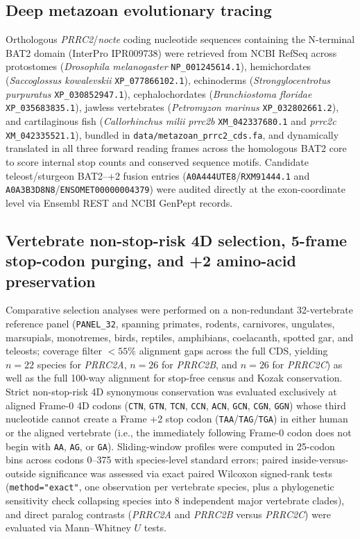 \documentclass[10pt,letterpaper]{article}
\newcommand{\spname}[1]{\textit{#1}}
\newcommand{\gene}[1]{\textit{#1}}
\begin{document}
\subsection{Deep metazoan evolutionary tracing}

Orthologous \gene{PRRC2}/\gene{nocte} coding nucleotide sequences containing the N-terminal BAT2 domain (InterPro IPR009738) were retrieved from NCBI RefSeq across protostomes (\spname{Drosophila melanogaster} \texttt{NP\_001245614.1}), hemichordates (\spname{Saccoglossus kowalevskii} \texttt{XP\_077866102.1}), echinoderms (\spname{Strongylocentrotus purpuratus} \texttt{XP\_030852947.1}), cephalochordates (\spname{Branchiostoma floridae} \texttt{XP\_035683835.1}), jawless vertebrates (\spname{Petromyzon marinus} \texttt{XP\_032802661.2}), and cartilaginous fish (\spname{Callorhinchus milii} \gene{prrc2b} \texttt{XM\_042337680.1} and \gene{prrc2c} \texttt{XM\_042335521.1}), bundled in \texttt{data/metazoan\_prrc2\_cds.fa}, and dynamically translated in all three forward reading frames across the homologous BAT2 core to score internal stop counts and conserved sequence motifs. Candidate teleost/sturgeon BAT2--+2 fusion entries (\texttt{A0A444UTE8}/\texttt{RXM91444.1} and \texttt{A0A3B3D8N8}/\texttt{ENSOMET00000004379}) were audited directly at the exon-coordinate level via Ensembl REST and NCBI GenPept records.

\subsection{Vertebrate non-stop-risk 4D selection, 5-frame stop-codon purging, and +2 amino-acid preservation}

Comparative selection analyses were performed on a non-redundant 32-vertebrate reference panel (\texttt{PANEL\_32}, spanning primates, rodents, carnivores, ungulates, marsupials, monotremes, birds, reptiles, amphibians, coelacanth, spotted gar, and teleosts; coverage filter $< 55\%$ alignment gaps across the full CDS, yielding $n = 22$ species for \gene{PRRC2A}, $n = 26$ for \gene{PRRC2B}, and $n = 26$ for \gene{PRRC2C}) as well as the full 100-way alignment for stop-free census and Kozak conservation. Strict non-stop-risk 4D synonymous conservation was evaluated exclusively at aligned Frame-0 4D codons (\texttt{CTN}, \texttt{GTN}, \texttt{TCN}, \texttt{CCN}, \texttt{ACN}, \texttt{GCN}, \texttt{CGN}, \texttt{GGN}) whose third nucleotide cannot create a Frame +2 stop codon (\texttt{TAA}/\texttt{TAG}/\texttt{TGA}) in either human or the aligned vertebrate (i.e., the immediately following Frame-0 codon does not begin with \texttt{AA}, \texttt{AG}, or \texttt{GA}). Sliding-window profiles were computed in 25-codon bins across codons 0--375 with species-level standard errors; paired inside-versus-outside significance was assessed via exact paired Wilcoxon signed-rank tests (\texttt{method="exact"}, one observation per vertebrate species, plus a phylogenetic sensitivity check collapsing species into 8 independent major vertebrate clades), and direct paralog contrasts (\gene{PRRC2A} and \gene{PRRC2B} versus \gene{PRRC2C}) were evaluated via Mann--Whitney $U$ tests.
\end{document}
